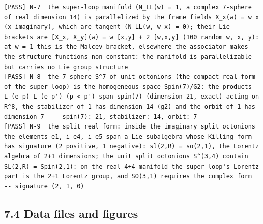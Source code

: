 \documentclass[
  10pt,
]{article}
\begin{document}
\begin{verbatim}
[PASS] N-7  the super-loop manifold (N_LL(w) = 1, a complex 7-sphere of real dimension 14) is parallelized by the frame fields X_x(w) = w x (x imaginary), which are tangent (N_LL(w, w x) = 0); their Lie brackets are [X_x, X_y](w) = w [x,y] + 2 [w,x,y] (100 random w, x, y): at w = 1 this is the Malcev bracket, elsewhere the associator makes the structure functions non-constant: the manifold is parallelizable but carries no Lie group structure
[PASS] N-8  the 7-sphere S^7 of unit octonions (the compact real form of the super-loop) is the homogeneous space Spin(7)/G2: the products L_(e_p) L_(e_p') (p < p') span spin(7) (dimension 21, exact) acting on R^8, the stabilizer of 1 has dimension 14 (g2) and the orbit of 1 has dimension 7  -- spin(7): 21, stabilizer: 14, orbit: 7
[PASS] N-9  the split real form: inside the imaginary split octonions the elements e1, i e4, i e5 span a Lie subalgebra whose Killing form has signature (2 positive, 1 negative): sl(2,R) = so(2,1), the Lorentz algebra of 2+1 dimensions; the unit split octonions S^(3,4) contain SL(2,R) = Spin(2,1): on the real 4+4 manifold the super-loop's Lorentz part is the 2+1 Lorentz group, and SO(3,1) requires the complex form  -- signature (2, 1, 0)
\end{verbatim}

\hypertarget{data-files-and-figures}{%
\subsection{7.4 Data files and figures}\label{data-files-and-figures}}
\end{document}
